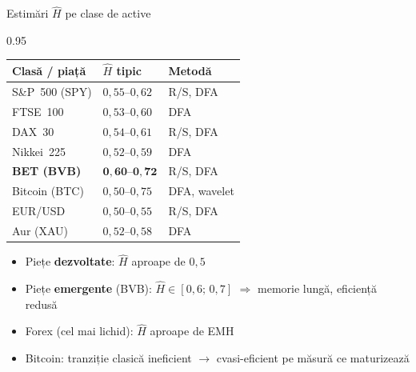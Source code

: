 \documentclass[9pt, aspectratio=169, t]{beamer}
\begin{document}
\begin{frame}[shrink=15]{Estimări $\hat H$ pe clase de active}
\begin{cminipage}{0.95\textwidth}
\renewcommand{\arraystretch}{1.2}
\centering
\small
\begin{tabular}{lll}
\toprule
\textbf{Clasă / piață} & \textbf{$\hat{H}$ tipic} & \textbf{Metodă} \\
\midrule
S\&P~500 (SPY) & $0{,}55$--$0{,}62$ & R/S, DFA \\
FTSE~100 & $0{,}53$--$0{,}60$ & DFA \\
DAX~30 & $0{,}54$--$0{,}61$ & R/S, DFA \\
Nikkei~225 & $0{,}52$--$0{,}59$ & DFA \\
\textbf{BET (BVB)} & $\mathbf{0{,}60}$--$\mathbf{0{,}72}$ & R/S, DFA \\
Bitcoin (BTC) & $0{,}50$--$0{,}75$ & DFA, wavelet \\
EUR/USD & $0{,}50$--$0{,}55$ & R/S, DFA \\
Aur (XAU) & $0{,}52$--$0{,}58$ & DFA \\
\bottomrule
\end{tabular}
\vspace{0.15cm}
\begin{itemize}\setlength{\itemsep}{0pt}
    \item Piețe \textbf{dezvoltate}: $\hat{H}$ aproape de $0{,}5$
    \item Piețe \textbf{emergente} (BVB): $\hat{H}\in[0{,}6;\,0{,}7]$ $\Rightarrow$ memorie lungă, eficiență redusă
    \item Forex (cel mai lichid): $\hat{H}$ aproape de EMH
    \item Bitcoin: tranziție clasică ineficient $\to$ cvasi-eficient pe măsură ce maturizează
\end{itemize}
\end{cminipage}
\end{frame}
\end{document}
